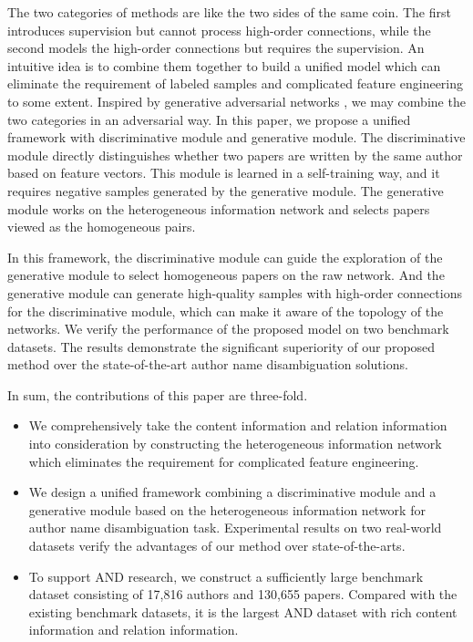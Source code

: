 \documentclass[letterpaper]{article} %
\begin{document}
The two categories of methods are like the two sides of the same coin. 
The first introduces supervision but cannot process high-order connections, while the second models the high-order connections but requires the supervision.
An intuitive idea is to combine them together to build a unified model which can eliminate the requirement of labeled samples and complicated feature engineering to some extent. 
Inspired by generative adversarial networks \cite{GAN}, we may combine the two categories in an adversarial way.
In this paper, we propose a unified framework with discriminative module and generative module. 
The discriminative module directly distinguishes whether two papers are written by the same author based on feature vectors. 
This module is learned in a self-training way, and it requires negative samples generated by the generative module. 
The generative module works on the heterogeneous information network and selects papers viewed as the homogeneous pairs.

In this framework, the discriminative module can guide the exploration of the generative module to select homogeneous papers on the raw network. 
And the generative module can generate high-quality samples with high-order connections for the discriminative module, which can make it aware of the topology of the networks. 
We verify the performance of the proposed model on two benchmark datasets. The results demonstrate the significant superiority of our proposed method over the state-of-the-art author name disambiguation solutions.

In sum, the contributions of this paper are three-fold.
\begin{itemize}
\item We comprehensively take the content information and relation information into consideration by constructing the heterogeneous information network which eliminates the requirement for complicated feature engineering.
\item We design a unified framework combining a discriminative module and a generative module based on the heterogeneous information network for author name disambiguation task.
Experimental results on two real-world datasets verify the advantages of our method over state-of-the-arts.
\item To support AND research, we construct a sufficiently large benchmark dataset consisting of 17,816 authors and 130,655 papers. Compared with the existing benchmark datasets, it is the largest AND dataset with rich content information and relation information.
\end{itemize}
\end{document}
